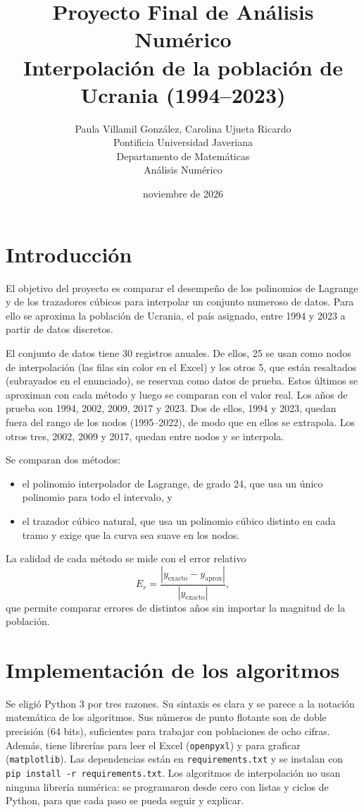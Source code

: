 \documentclass[11pt]{article}
\title{Proyecto Final de Análisis Numérico\\
\large Interpolación de la población de Ucrania (1994--2023)\\}
\author{Paula Villamil González, Carolina Ujueta Ricardo\\
Pontificia Universidad Javeriana\\
Departamento de Matemáticas\\
Análisis Numérico}
\date{noviembre de 2026}
\begin{document}
\maketitle

\section{Introducción}

El objetivo del proyecto es comparar el desempeño de los polinomios de Lagrange
y de los trazadores cúbicos para interpolar un conjunto numeroso de datos. Para
ello se aproxima la población de Ucrania, el país asignado, entre 1994 y 2023 a
partir de datos discretos.

El conjunto de datos tiene 30 registros anuales. De ellos, 25 se usan como nodos
de interpolación (las filas sin color en el Excel) y los otros 5, que están
resaltados (subrayados en el enunciado), se reservan como datos de prueba. Estos últimos se aproximan con cada
método y luego se comparan con el valor real. Los años de prueba son 1994, 2002,
2009, 2017 y 2023. Dos de ellos, 1994 y 2023, quedan fuera del rango de los
nodos (1995--2022), de modo que en ellos se extrapola. Los otros tres, 2002, 2009
y 2017, quedan entre nodos y se interpola.

Se comparan dos métodos:
\begin{itemize}
    \item el polinomio interpolador de Lagrange, de grado 24, que usa un único
    polinomio para todo el intervalo, y
    \item el trazador cúbico natural, que usa un polinomio cúbico distinto en cada
    tramo y exige que la curva sea suave en los nodos.
\end{itemize}

La calidad de cada método se mide con el error relativo
\[
E_r = \frac{|y_{\text{exacto}} - y_{\text{aprox}}|}{|y_{\text{exacto}}|},
\]
que permite comparar errores de distintos años sin importar la magnitud de la
población.

\section{Implementación de los algoritmos}

Se eligió Python 3 por tres razones. Su sintaxis es clara y se parece a la
notación matemática de los algoritmos. Sus números de punto flotante son de doble
precisión (64 bits), suficientes para trabajar con poblaciones de ocho cifras.
Además, tiene librerías para leer el Excel (\texttt{openpyxl}) y para graficar
(\texttt{matplotlib}). Las dependencias están en \texttt{requirements.txt} y se
instalan con \texttt{pip install -r requirements.txt}. Los algoritmos de
interpolación no usan ninguna librería numérica: se programaron desde cero con
listas y ciclos de Python, para que cada paso se pueda seguir y explicar.
\end{document}
